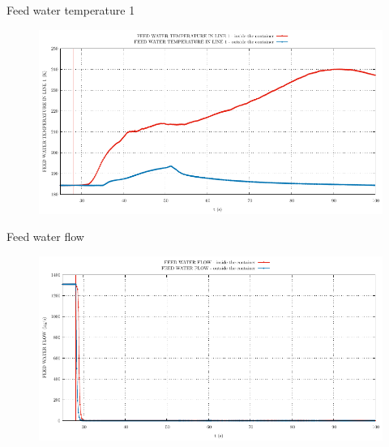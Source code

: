 \begin{frame}{Feed water temperature 1}
	\begin{figure}
			\centering
			\includegraphics[width=\textwidth]{./graphs/FEED WATER TEMPERATURE IN LINE 1_comp.pdf}
			
		\end{figure}
	
\end{frame}

\begin{frame}{Feed water flow}
	\begin{figure}
		\centering
		\includegraphics[width=\textwidth]{./graphs/FEED WATER FLOW_comp.pdf}
		
	\end{figure}
	
\end{frame}


